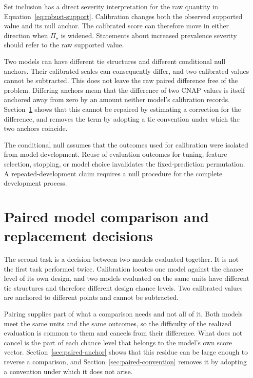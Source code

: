 \documentclass[11pt]{article}
\newcommand{\PSet}{\Pi_\star}
\theoremstyle{remark}
\begin{document}
Set inclusion has a direct severity interpretation for the raw quantity in Equation~\eqref{eq:robust-support}. Calibration changes both the observed supported value and its null anchor. The calibrated score can therefore move in either direction when $\PSet$ is widened. Statements about increased prevalence severity should refer to the raw supported value.

Two models can have different tie structures and different conditional null anchors. Their calibrated scales can consequently differ, and two calibrated values cannot be subtracted. This does not leave the raw paired difference free of the problem. Differing anchors mean that the difference of two CNAP values is itself anchored away from zero by an amount neither model's calibration records. Section~\ref{sec:paired} shows that this cannot be repaired by estimating a correction for the difference, and removes the term by adopting a tie convention under which the two anchors coincide.

The conditional null assumes that the outcomes used for calibration were isolated from model development. Reuse of evaluation outcomes for tuning, feature selection, stopping, or model choice invalidates the fixed-prediction permutation. A repeated-development claim requires a null procedure for the complete development process.

\section{Paired model comparison and replacement decisions}
\label{sec:paired}

The second task is a decision between two models evaluated together. It is not the first task performed twice. Calibration locates one model against the chance level of its own design, and two models evaluated on the same units have different tie structures and therefore different design chance levels. Two calibrated values are anchored to different points and cannot be subtracted.

Pairing supplies part of what a comparison needs and not all of it. Both models meet the same units and the same outcomes, so the difficulty of the realized evaluation is common to them and cancels from their difference. What does not cancel is the part of each chance level that belongs to the model's own score vector. Section~\ref{sec:paired-anchor} shows that this residue can be large enough to reverse a comparison, and Section~\ref{sec:paired-convention} removes it by adopting a convention under which it does not arise.
\end{document}
